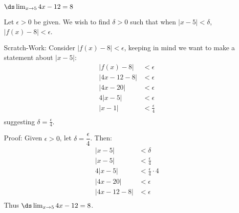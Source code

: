{$\ds\lim_{x\to 5} 4x-12=8$}
{Let $\epsilon >0$ be given. We wish to find $\delta >0$ such that when $|x-5|<\delta$, $|f(x)-8|<\epsilon$. 

Scratch-Work:
Consider $|f(x)-8|<\epsilon$, keeping in  mind we want to make a statement about $|x-5|$:
\begin{align*}
|f(x)-8|&<\epsilon \\
|4x-12-8|&<\epsilon \\
|4x-20|&<\epsilon\\
4|x-5|&<\epsilon \\
|x-1|&<\frac{\epsilon}{4}\\
\end{align*}
suggesting $\delta =\frac{\epsilon}4$.

Proof: Given $\epsilon>0$, let $\delta =\dfrac{\epsilon}4$. Then:
\begin{align*}
|x - 5| &< \delta \\
|x - 5| &< \frac{\epsilon}{4} \\
4|x - 5| &< \frac{\epsilon}{4}\cdot 4\\
|4x-20|&< \epsilon \\
|4x-12-8|&< \epsilon  \\
\end{align*}
Thus  $\ds \lim_{x\to 5}4x-12=8$.}


